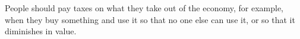 People should pay taxes on what they take out of the economy, for example, when they buy something and use it so that no one else can use it, or so that it diminishes in value.